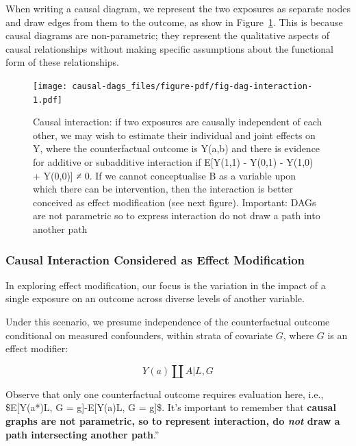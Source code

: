\documentclass[
  singlecolumn]{report}
\begin{document}
When writing a causal diagram, we represent the two exposures as
separate nodes and draw edges from them to the outcome, as show in
Figure~\ref{fig-dag-interaction}. This is because causal diagrams are
non-parametric; they represent the qualitative aspects of causal
relationships without making specific assumptions about the functional
form of these relationships.

\begin{figure}

{\centering \texttt{[image: causal-dags\_files/figure-pdf/fig-dag-interaction-1.pdf]}

}

\caption{\label{fig-dag-interaction}Causal interaction: if two exposures
are causally independent of each other, we may wish to estimate their
individual and joint effects on Y, where the counterfactual outcome is
Y(a,b) and there is evidence for additive or subadditive interaction if
E{[}Y(1,1) - Y(0,1) - Y(1,0) + Y(0,0){]} ≠ 0. If we cannot conceptualise
B as a variable upon which there can be intervention, then the
interaction is better conceived as effect modification (see next
figure). Important: DAGs are not parametric so to express interaction do
not draw a path into another path}

\end{figure}

\hypertarget{causal-interaction-considered-as-effect-modification}{%
\subsubsection{\texorpdfstring{\textbf{Causal Interaction Considered as
Effect
Modification}}{Causal Interaction Considered as Effect Modification}}\label{causal-interaction-considered-as-effect-modification}}

In exploring effect modification, our focus is the variation in the
impact of a single exposure on an outcome across diverse levels of
another variable.

Under this scenario, we presume independence of the counterfactual
outcome conditional on measured confounders, within strata of covariate
\(G\), where \(G\) is an effect modifier:

\[Y(a) \coprod A | L, G\]

Observe that only one counterfactual outcome requires evaluation here,
i.e., \$E{[}Y(a*)\textbar L, G = g{]}-E{[}Y(a)\textbar L, G = g{]}\$.
It's important to remember that \textbf{causal graphs are not
parametric, so to represent interaction, do \emph{not} draw a path
intersecting another path}.''
\end{document}
